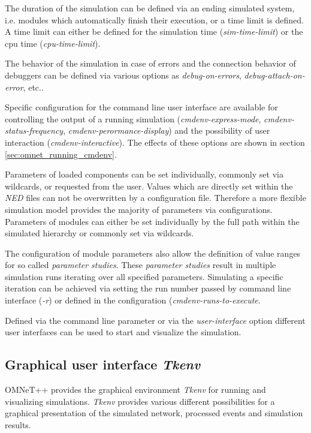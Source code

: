 The duration of the simulation can be defined via an ending simulated system, i.e. modules which automatically finish their execution, or a time limit is defined.
A time limit can either be defined for the simulation time (\emph{sim-time-limit}) or the cpu time (\emph{cpu-time-limit}).

The behavior of the simulation in case of errors and the connection behavior of debuggers can be defined via various options as \emph{debug-on-errors}, \emph{debug-attach-on-error}, etc.. \cite[section 10.1.3]{omnet_manual}

Specific configuration for the command line user interface are available for controlling the output of a running simulation (\emph{cmdenv-express-mode}, \emph{cmdenv-status-frequency}, \emph{cmdenv-perormance-display}) and the possibility of user interaction (\emph{cmdenv-interactive}).
The effects of these options are shown in section \ref{sec:omnet_running_cmdenv}.

Parameters of loaded components can be set individually, commonly set via wildcards, or requested from the user.
Values which are directly set within the \emph{NED} files can not be overwritten by a configuration file.
Therefore a more flexible simulation model provides the majority of parameters via configurations.
Parameters of modules can either be set individually by the full path within the simulated hierarchy or commonly set via wildcards. \cite[section 9.3]{omnet_manual}

The configuration of module parameters also allow the definition of value ranges for so called \emph{parameter studies}.
These \emph{parameter studies} result in multiple simulation runs iterating over all specified parameters.
Simulating a specific iteration can be achieved via setting the run number passed by command line interface (\emph{-r}) or defined in the configuration (\emph{cmdenv-runs-to-execute}. \cite[section 9.4]{omnet_manual}

Defined via the command line parameter or via the \emph{user-interface} option different user interfaces can be used to start and visualize the simulation.

\subsection{Graphical user interface \emph{Tkenv}}
\label{sec:omnet_running_tkenv}
OMNeT++ provides the graphical environment \emph{Tkenv} for running and visualizing simulations.
\emph{Tkenv} provides various different possibilities for a graphical presentation of the simulated network, processed events and simulation results.

